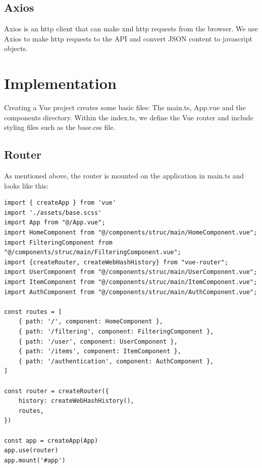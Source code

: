 \subsection{Axios}

Axios is an http client that can make xml http requests from the browser. We use Axios to make http requests to the API and convert JSON content to javascript objects.

\section{Implementation}

\label{sec:demo_impl}

Creating a Vue project creates some basic files: The main.ts, App.vue and the components directory. Within the index.ts, we define the Vue router and include styling files such as the base.css file.

\subsection{Router}

As mentioned above, the router is mounted on the application in main.ts and looks like this:

\newpage

\begin{verbatim}
import { createApp } from 'vue'
import './assets/base.scss'
import App from "@/App.vue";
import HomeComponent from "@/components/struc/main/HomeComponent.vue";
import FilteringComponent from "@/components/struc/main/FilteringComponent.vue";
import {createRouter, createWebHashHistory} from "vue-router";
import UserComponent from "@/components/struc/main/UserComponent.vue";
import ItemComponent from "@/components/struc/main/ItemComponent.vue";
import AuthComponent from "@/components/struc/main/AuthComponent.vue";

const routes = [
    { path: '/', component: HomeComponent },
    { path: '/filtering', component: FilteringComponent },
    { path: '/user', component: UserComponent },
    { path: '/items', component: ItemComponent },
    { path: '/authentication', component: AuthComponent },
]

const router = createRouter({
    history: createWebHashHistory(),
    routes,
})

const app = createApp(App)
app.use(router)
app.mount('#app')
\end{verbatim}

